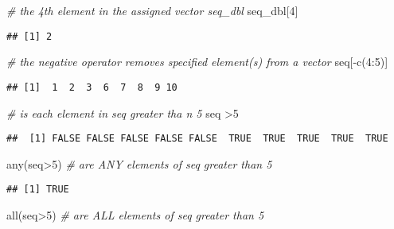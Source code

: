 \documentclass[
]{article}
\newenvironment{Shaded}{\begin{snugshade}}{\end{snugshade}}
\newcommand{\CommentTok}[1]{\textcolor[rgb]{0.56,0.35,0.01}{\textit{#1}}}
\newcommand{\DecValTok}[1]{\textcolor[rgb]{0.00,0.00,0.81}{#1}}
\newcommand{\FunctionTok}[1]{\textcolor[rgb]{0.00,0.00,0.00}{#1}}
\newcommand{\NormalTok}[1]{#1}
\newcommand{\SpecialCharTok}[1]{\textcolor[rgb]{0.00,0.00,0.00}{#1}}
\begin{document}
\begin{Shaded}
\begin{Highlighting}[]
\CommentTok{\# the 4th element in the assigned vector seq\_dbl}
\NormalTok{seq\_dbl[}\DecValTok{4}\NormalTok{]                  }
\end{Highlighting}
\end{Shaded}

\begin{verbatim}
## [1] 2
\end{verbatim}

\begin{Shaded}
\begin{Highlighting}[]
\CommentTok{\# the negative operator removes specified element(s) from a vector}
\NormalTok{seq[}\SpecialCharTok{{-}}\FunctionTok{c}\NormalTok{(}\DecValTok{4}\SpecialCharTok{:}\DecValTok{5}\NormalTok{)]                }
\end{Highlighting}
\end{Shaded}

\begin{verbatim}
## [1]  1  2  3  6  7  8  9 10
\end{verbatim}

\begin{Shaded}
\begin{Highlighting}[]
\CommentTok{\# is each element in seq greater tha  n 5}
\NormalTok{seq }\SpecialCharTok{\textgreater{}}\DecValTok{5}                  
\end{Highlighting}
\end{Shaded}

\begin{verbatim}
##  [1] FALSE FALSE FALSE FALSE FALSE  TRUE  TRUE  TRUE  TRUE  TRUE
\end{verbatim}

\begin{Shaded}
\begin{Highlighting}[]
\FunctionTok{any}\NormalTok{(seq}\SpecialCharTok{\textgreater{}}\DecValTok{5}\NormalTok{)                  }\CommentTok{\# are ANY elements of seq greater than 5}
\end{Highlighting}
\end{Shaded}

\begin{verbatim}
## [1] TRUE
\end{verbatim}

\begin{Shaded}
\begin{Highlighting}[]
\FunctionTok{all}\NormalTok{(seq}\SpecialCharTok{\textgreater{}}\DecValTok{5}\NormalTok{)                  }\CommentTok{\# are ALL elements of seq greater than 5}
\end{Highlighting}
\end{Shaded}
\end{document}
